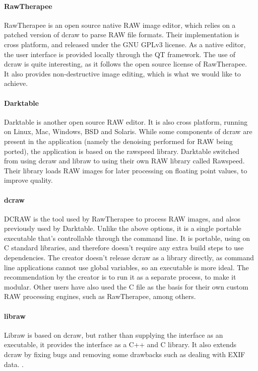 \documentclass[11pt,a4paper]{article}
\begin{document}
    \paragraph{RawTherapee}
    RawTherapee is an open source native RAW image editor, which relies on a patched version of dcraw to parse RAW file formats.
    Their implementation is cross platform, and released under the GNU GPLv3 license. As a native editor, the user interface is provided
    locally through the QT framework. The use of dcraw is quite interesting, as it follows the open source license of RawTherapee. \cite{RawTherapeeReadme}
    It also provides non-destructive image editing, which is what we would like to achieve.
    \paragraph{Darktable}
    Darktable is another open source RAW editor. It is also cross platform, running on Linux, Mac, Windows, BSD and Solaris. While some components
    of dcraw are present in the application (namely the denoising performed for RAW being ported), the application is based on the rawspeed library.
    Darktable switched from using dcraw and libraw to using their own RAW library called Rawspeed. Their library loads RAW images for later
    processing on floating point values, to improve quality.  \cite{DarkTableAbout}

    \paragraph{dcraw}
    DCRAW is the tool used by RawTherapee to process RAW images, and alsos previously used by Darktable. Unlike the above options, it is a single portable
    executable that's controllable through the command line. It is portable, using on C standard libraries, and therefore doesn't require any extra build steps
    to use dependencies. The creator doesn't release dcraw as a library directly, as command line applications cannot use global variables, so an executable is
    more ideal. The recommendation by the creator is to run it as a separate process, to make it modular. Other users have also used the C file
    as the basis for their own custom RAW processing engines, such as RawTherapee, among others. \cite{DCRAWSource}

    \paragraph{libraw}
    Libraw is based on dcraw, but rather than supplying the interface as an executable, it provides the interface as a C++ and C library.
    It also extends dcraw by fixing bugs and removing some drawbacks such as dealing with EXIF data. \cite{LibrawSource}.
\end{document}
